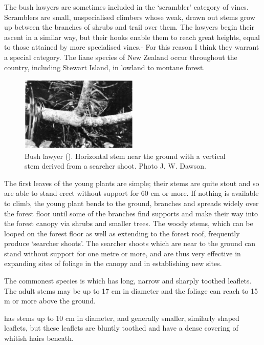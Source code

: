 The bush lawyers are sometimes included in the `scrambler' category of vines.
Scramblers are small, unspecialised climbers whose weak, drawn out stems grow up between the branches of shrubs and trail over them.
The lawyers begin their ascent in a similar way, but their hooks enable them to reach great heights, equal to those attained by more specialised vines.- For this reason I think they warrant a special category.
The liane species of New Zealand  occur throughout the country, including Stewart Island, in lowland to montane forest.

\begin{figure}
	\includegraphics[width=0.5\textwidth]{graphics/figure36bushlawyer.jpg}
	\centering
	\caption[Bush lawyer]{Bush lawyer ().
	Horizontal stem near the ground with a vertical stem derived from a searcher shoot.
	Photo  J. W. Dawson.}%
	\label{fig:36bushlawyer}
\end{figure}

The first leaves of the young plants are simple; their stems are quite stout and so are able to stand erect without support for 60 cm or more.
If nothing is available to climb, the young plant bends to the ground, branches and spreads widely over the forest floor until some of the branches find supports and make their way into the forest canopy via shrubs and smaller trees.
The woody stems, which can be looped on the forest floor as well as extending to the forest roof, frequently produce `searcher shoots'.
The searcher shoots which are near to the ground can stand without support for one metre or more, and are thus very effective in expanding sites of  foliage in the canopy and in establishing new sites.

The commonest species is  which has long, narrow and sharply toothed leaflets.
The adult stems may be up to 17 cm in diameter and the foliage can reach to 15 m or more above the ground.

 has stems up to 10 cm in diameter, and generally smaller, similarly shaped leaflets, but these leaflets are bluntly toothed and have a dense covering of whitish hairs beneath.

